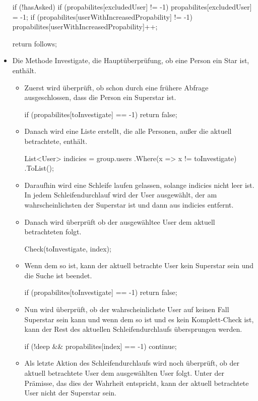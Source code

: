 \documentclass{article}
\begin{document}
\begin{flushleft}
\begin{itemize}
\begin{Csharp}
{    if (!hasAsked)
    {
        if (propabilites[excludedUser] != -1)
        {
            propabilites[excludedUser] = -1;
        }
        if (propabilites[userWithIncreasedPropability] != -1)
        {
            propabilites[userWithIncreasedPropability]++;
        }
    }

    return follows;
}
\end{Csharp}
	\newpage
	\item Die Methode Investigate, die Hauptüberprüfung, ob eine Person ein Star ist, enthält.
	\begin{itemize}
		\item Zuerst wird überprüft, ob schon durch eine frühere Abfrage ausgeschlossen, dass die Person ein Superstar ist.
\begin{Csharp}
if (propabilites[toInvestigate] == -1) return false;
\end{Csharp}
		\item Danach wird eine Liste erstellt, die alle Personen, außer die aktuell betrachtete, enthält.
\begin{Csharp}
List<User> indicies = group.users
	.Where(x => x != toInvestigate)
	.ToList();
\end{Csharp}
		\item Daraufhin wird eine Schleife laufen gelassen, solange indicies nicht leer ist. In jedem Schleifendurchlauf wird der User ausgewählt, der am wahrscheinlichsten der Superstar ist und dann aus indicies entfernt.
		\item Danach wird überprüft ob der ausgewähltee User dem aktuell betrachteten folgt.
\begin{Csharp}
Check(toInvestigate, index);
\end{Csharp}
		\item Wenn dem so ist, kann der aktuell betrachte User kein Superstar sein und die Suche ist beendet.
\begin{Csharp}
if (propabilites[toInvestigate] == -1) return false;
\end{Csharp}
		\item Nun wird überprüft, ob der wahrscheinlichste User auf keinen Fall Superstar sein kann und wenn dem so ist und es kein Komplett-Check ist, kann der Rest des aktuellen Schleifendurchlaufs übersprungen werden.
\begin{Csharp}
if (!deep && propabilites[index] == -1) continue;
\end{Csharp}
		\item Als letzte Aktion des Schleifendurchlaufs wird noch überprüft, ob der aktuell betrachtete User dem ausgewählten User folgt. Unter der Prämisse, das dies der Wahrheit entspricht, kann der aktuell betrachtete User nicht der Superstar sein.

\end{itemize}
\end{itemize}
\end{flushleft}
\end{document}

